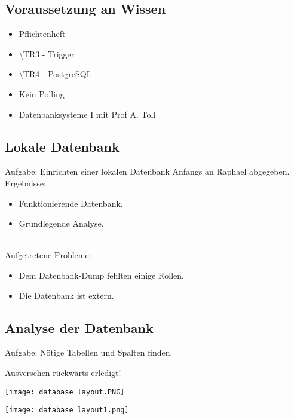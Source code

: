 \documentclass[ignorenonframetext, 11pt, table]{beamer}
\begin{document}
\subsection{Voraussetzung an Wissen}
\begin{frame}
\begin{itemize}
\item Pflichtenheft \pause
\item \textbackslash TR3 - Trigger \pause
\item \textbackslash TR4 - PostgreSQL \pause
\item Kein Polling
\item Datenbanksysteme I mit Prof A. Toll
\end{itemize}
\end{frame}

\subsection{Lokale Datenbank}
\begin{frame}
Aufgabe: Einrichten einer lokalen Datenbank\pause
\newline\newline
Anfangs an Raphael abgegeben.\newline\newline\pause
Ergebnisse:\pause
\begin{itemize}
\item Funktionierende Datenbank.\pause
\item Grundlegende Analyse.\pause
\end{itemize}
~\\
Aufgetretene Probleme:\pause
\begin{itemize}
\item Dem Datenbank-Dump fehlten einige Rollen. \pause
\item Die Datenbank ist extern.
\end{itemize}
\end{frame}

\subsection{Analyse der Datenbank}
\begin{frame}
Aufgabe: Nötige Tabellen und Spalten finden.\newline\pause

Ausversehen rückwärts erledigt!
\end{frame}

\begin{frame}
\texttt{[image: database\_layout.PNG]}
\end{frame}
\begin{frame}
\texttt{[image: database\_layout1.png]}
\end{frame}
\end{document}

